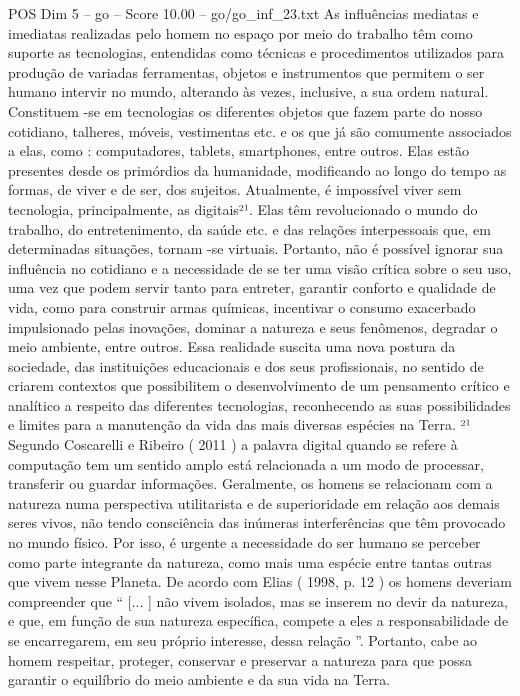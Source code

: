 \begin{textsample}{POS Dim 5 – go – Score 10.00 – go/go\_inf\_23.txt}
As influências mediatas e imediatas realizadas pelo homem no espaço por meio do trabalho têm como suporte as tecnologias, entendidas como técnicas e procedimentos utilizados para produção de variadas ferramentas, objetos e instrumentos que permitem o ser humano intervir no mundo, alterando às vezes, inclusive, a sua ordem natural.
Constituem -se em tecnologias os diferentes objetos que fazem parte do nosso cotidiano, talheres, móveis, vestimentas etc. e os que já são comumente associados a elas, como : computadores, tablets, smartphones, entre outros.
Elas estão presentes desde os primórdios da humanidade, modificando ao longo do tempo as formas, de viver e de ser, dos sujeitos.
Atualmente, é impossível viver sem tecnologia, principalmente, as digitais²¹.
Elas têm revolucionado o mundo do trabalho, do entretenimento, da saúde etc. e das relações interpessoais que, em determinadas situações, tornam -se virtuais.
Portanto, não é possível ignorar sua influência no cotidiano e a necessidade de se ter uma visão crítica sobre o seu uso, uma vez que podem servir tanto para entreter, garantir conforto e qualidade de vida, como para construir armas químicas, incentivar o consumo exacerbado impulsionado pelas inovações, dominar a natureza e seus fenômenos, degradar o meio ambiente, entre outros.
Essa realidade suscita uma nova postura da sociedade, das instituições educacionais e dos seus profissionais, no sentido de criarem contextos que possibilitem o desenvolvimento de um pensamento crítico e analítico a respeito das diferentes tecnologias, reconhecendo as suas possibilidades e limites para a manutenção da vida das mais diversas espécies na Terra. ²¹ Segundo Coscarelli e Ribeiro ( 2011 ) a palavra digital quando se refere à computação tem um sentido amplo está relacionada a um modo de processar, transferir ou guardar informações.
Geralmente, os homens se relacionam com a natureza numa perspectiva utilitarista e de superioridade em relação aos demais seres vivos, não tendo consciência das inúmeras interferências que têm provocado no mundo físico.
Por isso, é urgente a necessidade do ser humano se perceber como parte integrante da natureza, como mais uma espécie entre tantas outras que vivem nesse Planeta.
De acordo com Elias ( 1998, p. 12 ) os homens deveriam compreender que “ [... ] não vivem isolados, mas se inserem no devir da natureza, e que, em função de sua natureza específica, compete a eles a responsabilidade de se encarregarem, em seu próprio interesse, dessa relação ”.
Portanto, cabe ao homem respeitar, proteger, conservar e preservar a natureza para que possa garantir o equilíbrio do meio ambiente e da sua vida na Terra.

\end{textsample}
